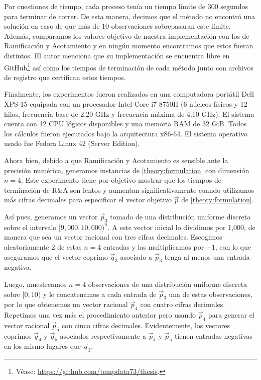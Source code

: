 Por cuestiones de tiempo, cada proceso tenía un tiempo límite de 300 segundos para terminar de
correr. De esta manera, decimos que el método no encontró una solución en caso de que más de 10
observaciones sobrepasaran este límite. Además, comparamos los valores objetivo de nuestra
implementación con los de Ramificación y Acotamiento y en ningún momento encontramos que estos
fueran distintos. El autor menciona que su implementación se encuentra libre en
GitHub\footnote{Véase: \url{https://github.com/tempdata73/thesis}.} así como
los tiempos de terminación de cada método junto con archivos de registro que
certifican estos tiempos.

Finalmente, los experimentos fueron realizados en una computadora portátil Dell XPS 15 equipada con
un procesador Intel Core i7-8750H (6 núcleos físicos y 12 hilos, frecuencia base de 2.20 GHz y
frecuencia máxima de 4.10 GHz). El sistema cuenta con 12 CPU lógicos disponibles y una memoria RAM
de 32 GiB. Todos los cálculos fueron ejecutados bajo la arquitectura x86-64. El sistema operativo
usado fue Fedora Linux 42 (Server Edition).

Ahora bien, debido a que Ramificación y Acotamiento es sensible ante la precisión numérica,
generamos instancias de \eqref{theory:formulation} con dimensión $n = 4$. Este experimento tiene por
objetivo mostrar que los tiempos de terminación de R\&A son lentos y aumentan significativamente
cuando utilizamos más cifras decimales para especificar el vector objetivo $\vec{p}$ de
\eqref{theory:formulation}.

Así pues, generamos un vector $\vec{p}_3$ tomado de una distribución uniforme discreta sobre el
intervalo $[9{,}000, 10{,}000)^n$. A este vector inicial lo dividimos por 1{,}000, de manera que sea un
vector racional con tres cifras decimales. Escogimos aleatoriamente 2 de estas $n = 4$ entradas y
las multiplicamos por $-1$, con lo que aseguramos que el vector coprimo $\vec{q}_3$ asociado a
$\vec{p}_3$ tenga al menos una entrada negativa.

Luego, muestreamos $n = 4$ observaciones de una distribución uniforme discreta sobre $[0, 10)$ y le
concatenamos a cada entrada de $\vec{p}_3$ una de estas observaciones, por lo que obtenemos un
vector racional $\vec{p}_4$ con cuatro cifras decimales. Repetimos una vez más el procedimiento
anterior pero usando $\vec{p}_4$ para generar el vector racional $\vec{p}_5$ con cinco cifras
decimales. Evidentemente, los vectores coprimos $\vec{q}_4$ y $\vec{q}_5$ asociados respectivamente
a $\vec{p}_4$ y $\vec{p}_5$ tienen entradas negativas en los mismo lugares que $\vec{q}_3$.

